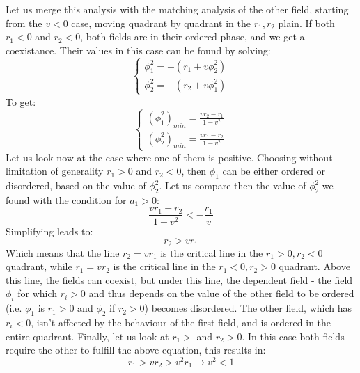 \documentclass{article}
\begin{document}
\newline
Let us merge this analysis with the matching analysis of the other field, starting from the $v < 0$ case, moving quadrant by quadrant in the $r_1,r_2$ plain.
\newline
If both $r_1 < 0$ and $r_2 < 0$, both fields are in their ordered phase, and we get a coexistance. Their values in this case can be found by solving:
\begin{equation}
\begin{cases}
    \phi_1^2 = -(r_1 + v\phi_2^2)
    \\
    \phi_2^2 = -(r_2 + v\phi_1^2)
\end{cases}
\end{equation}
To get:
\begin{equation}
\begin{cases}
    (\phi_1^2)_{min} = \frac{vr_2 - r_1}{1-v^2}
    \\
    (\phi_2^2)_{min} = \frac{vr_1 - r_2}{1-v^2}
\end{cases}
\end{equation}
Let us look now at the case where one of them is positive. Choosing without limitation of generality $r_1 > 0$ and $r_2 < 0$, then $\phi_1$ can be either ordered or disordered, based on the value of $\phi_2^2$.
Let us compare then the value of $\phi_2^2$ we found with the condition for $a_1 > 0$:
\begin{equation}
    \frac{vr_1 - r_2}{1-v^2} < -\frac{r_1}{v}
\end{equation}
Simplifying leads to:
\begin{equation}
    r_2 > vr_1
\end{equation}
Which means that the line $r_2 = vr_1$ is the critical line in the $r_1 > 0, r_2 < 0$ quadrant, while $r_1 = vr_2$ is the critical line in the $r_1 < 0, r_2 > 0$ quadrant. Above this line, the fields can coexist, but under this line, the dependent field - the field $\phi_i$ for which $r_i > 0$ and thus depends on the value of the other field to be ordered (i.e. $\phi_1$ is $r_1 > 0$ and $\phi_2$ if $r_2 > 0$) becomes disordered. The other field, which has $r_i < 0$, isn't affected by the behaviour of the first field, and is ordered in the entire quadrant.
\newline
Finally, let us look at $r_1 > $ and $r_2 > 0$. In this case both fields require the other to fulfill the above equation, this results in:
\begin{equation}
    r_1 > vr_2 > v^2 r_1 \rightarrow v^2 < 1
\end{equation}
\end{document}
